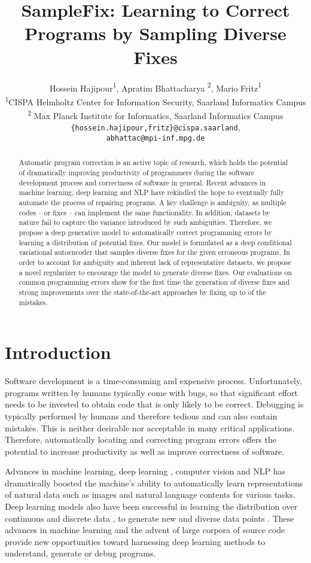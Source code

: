\documentclass[letterpaper]{article} \usepackage{aaai20}  \usepackage{times}  \usepackage{helvet} \usepackage{courier}  \usepackage[hyphens]{url}  \usepackage{graphicx}
\title{SampleFix: Learning to Correct Programs by Sampling Diverse Fixes }
\author{
Hossein Hajipour{\normalfont \textsuperscript{1}}, Apratim Bhattacharya {\normalfont \textsuperscript{2}}, Mario Fritz{\normalfont \textsuperscript{1}}  \vspace{0.1cm} \\
  \textsuperscript{1}CISPA Helmholtz Center for Information Security, Saarland Informatics Campus \\ \textsuperscript{2}  Max Planck Institute for Informatics, Saarland Informatics Campus
 \\
  \texttt{\{hossein.hajipour,fritz\}@cispa.saarland}, \\
  \texttt{abhattac@mpi-inf.mpg.de} \vspace{-.4cm}
}
\begin{document}
\maketitle

\begin{abstract}
Automatic program correction is an active topic of research, which holds the potential of dramatically improving productivity of programmers during the software development process and correctness of software in general. Recent advances in machine learning, deep learning and NLP have rekindled the hope to eventually fully automate the process of repairing programs. A key challenge is ambiguity, as multiple codes -- or fixes -- can implement the same functionality. In addition, datasets by nature fail to capture the variance introduced by such ambiguities. Therefore, we propose a deep generative model to automatically correct programming errors by learning a distribution of potential fixes. Our model is formulated as a deep conditional variational autoencoder that samples diverse fixes for the given erroneous programs. In order to account for ambiguity and inherent lack of representative datasets, we propose a novel regularizer to encourage the model to generate diverse fixes. Our evaluations on common programming errors show for the first time the generation of diverse fixes and strong improvements over the state-of-the-art approaches by fixing up to  of the mistakes. 
\end{abstract}


\section{Introduction}
\label{introduction}
Software development is a time-consuming and expensive process. Unfortunately, programs written by humans typically come with bugs, so that significant effort needs to be invested to obtain code that is only likely to be correct. 
Debugging is typically performed by humans and therefore tedious and can also contain mistakes. This is neither desirable nor acceptable in many critical applications. Therefore, automatically locating and correcting program errors offers the potential to increase productivity as well as improve correctness of software. 


Advances in machine learning, deep learning \cite{Lecun98gradient-basedlearning,ng11unsupervised,alexnet}, computer vision \cite{Girshick15fast,Simonyan15} and NLP \cite{sutskever14seq2seq,Bahdanau2015NeuralMT} has  dramatically boosted the machine's ability to automatically learn representations of natural data such as images and natural language contents for various tasks.  Deep learning models also have been successful in learning the distribution over continuous \cite{cvae15sohn,autoencodr14kingma} and discrete data \cite{Maddison2017TheCD,jang18gumbel}, to generate new and diverse data points \cite{three_pillars}. These advances in machine learning and the advent of large corpora of source code \cite{bigcode} provide new opportunities toward harnessing deep learning methods to understand, generate or debug programs.
\end{document}
